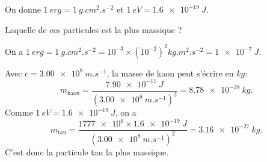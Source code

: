On donne $\SI{1}{erg}=\SI{1}{g.cm^{2}.s^{-2}}$ et $\SI{1}{eV} = \SI{1.6e-19}{J}$.



\begin{enonce}
Laquelle de ces particules est la plus massique ?
\end{enonce}


\begin{corrige}
On a $\SI{1}{erg}=\SI{1}{g.cm^{2}.s^{-2}}=10^{-3}\times\left(10^{-2}\right)^{2}\si{kg.m^{2}.s^{-2}}=\SI{1e-7}{J}$.

Avec $c=\SI{3.00e8}{m.s^{-1}}$, la masse de kaon peut s'écrire en
$\si{kg}$:
\[
m_{\text{kaon}}=\dfrac{\SI{7.90e-11}{J}}{\left(\SI{3.00e8}{m.s^{-1}}\right)^{2}}=\SI{8.78e-28}{kg}.
\]
Comme $\SI{1}{eV} = \SI{1.6e-19}{J}$, on a
\[
m_{\text{tau}}=\dfrac{\num{1777e6}\times\SI{1.6e-19}{J}}{\left(\SI{3.00e8}{m.s^{-1}}\right)^{2}}=\SI{3.16e-27}{kg}.
\]
C'est donc la particule tau la plus massique.
\end{corrige}


\finEntrainement








\newpage






\hauteurLargeurCadreReponse		{8mm}{3.5cm}
\initialisationEntrainement



